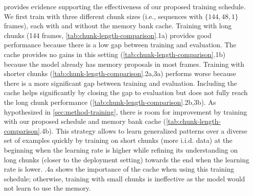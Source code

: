  provides evidence supporting the effectiveness of our proposed training schedule.
We first train \ourmodel{} with three different chunk sizes
(i.e., sequences with $\{144, 48, 1\}$ frames), each with and without
the memory bank cache.
Training with long chunks (144 frames, \cref{tab:chunk-length-comparison}.1a) provides good performance
because there is a low gap between training and evaluation.
The cache provides no gains in this setting (\cref{tab:chunk-length-comparison}.1b) because the model already has memory proposals in most frames.
Training with shorter chunks (\cref{tab:chunk-length-comparison}.2a,3a) performs worse because there is a more significant gap between training and evaluation.
Including the cache helps significantly by closing the gap to evaluation but does not fully reach the long chunk performance (\cref{tab:chunk-length-comparison}.2b,3b).
As hypothesized in \cref{sec:method-training}, there is room for improvement by training with our proposed schedule and memory bank cache (\cref{tab:chunk-length-comparison}.4b). This strategy allows \ourmodel{} to learn generalized patterns over a diverse set of examples quickly by training on short chunks (more i.i.d. data) at the beginning when the learning rate is higher while refining its understanding on long chunks (closer to the deployment setting) towards the end when the learning rate is lower.
.4a shows the importance of the cache when using this training schedule; otherwise, training with small chunks is ineffective as the model would not learn to use the memory.